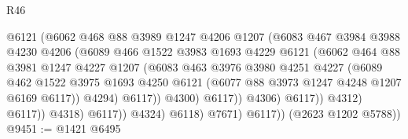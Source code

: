 \begin{lexlean}{R46}
\begin{coremodule}
                                    @6121
                                    (@6062
                                      @468
                                      @88
                                      @3989
                                      @1247
                                      @4206
                                      @1207
                                      (@6083
                                        @467
                                        @3984
                                        @3988
                                        @4230
                                        @4206
                                        (@6089
                                          @466
                                          @1522
                                          @3983
                                          @1693
                                          @4229
                                          @6121
                                          (@6062
                                            @464
                                            @88
                                            @3981
                                            @1247
                                            @4227
                                            @1207
                                            (@6083
                                              @463
                                              @3976
                                              @3980
                                              @4251
                                              @4227
                                              (@6089
                                                @462
                                                @1522
                                                @3975
                                                @1693
                                                @4250
                                                @6121
                                                (@6077 @88 @3973 @1247 @4248 @1207 @6169 @6117))
                                              @4294)
                                            @6117))
                                        @4300)
                                      @6117))
                                  @4306)
                                @6117))
                            @4312)
                          @6117))
                      @4318)
                    @6117))
                @4324)
              @6118)
            @7671)
          @6117))
      (@2623 @1202 @5788))
@9451 := @1421 @6495

\end{coremodule}
\end{lexlean}
